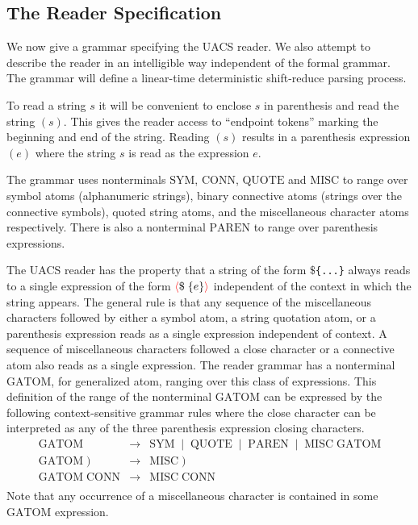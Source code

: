 \documentclass{article}
\newcommand{\fopen}{{\color{red} \langle}}
\newcommand{\fclose}{{\color{red} \rangle}}
\begin{document}
\subsection{The Reader Specification}
\label{sec:reader}

\newcommand{\sym}{\mathrm{SYM}}
\newcommand{\conn}{\mathrm{CONN}}
\newcommand{\quot}{\mathrm{QUOTE}}
\newcommand{\misc}{\mathrm{MISC}}
\newcommand{\gatom}{\mathrm{GATOM}}
\newcommand{\argg}{\mathrm{ARG}}
\newcommand{\e}{\mathrm{E}}
\newcommand{\paren}{\mathrm{PAREN}}
\newcommand{\foo}{\mathtt{foo}}
\newcommand{\barr}{\mathtt{bar}}
  
We now give a grammar specifying the UACS reader.  We also attempt to describe the reader in an intelligible way independent of the formal grammar.
The grammar will define a linear-time deterministic shift-reduce parsing process.

To read a string $s$ it will be convenient to enclose $s$ in parenthesis and read the string $(s)$.  This gives the reader access to ``endpoint tokens'' marking the beginning and end of the string.
Reading $(s)$ results in a parenthesis expression $(e)$ where the string $s$ is read as the expression $e$.

The grammar uses nonterminals
$\sym$, $\conn$, $\quot$ and $\misc$ to range over symbol atoms (alphanumeric strings), binary connective atoms (strings over the connective symbols), quoted string atoms, and
the miscellaneous character atoms respectively.  There is also a nonterminal $\paren$ to range over parenthesis expressions.


The UACS reader has the property that a string of the form {\tt $\$$\{...\}} always reads to a single expression of the form $\fopen \$\;\{e\}\fclose$ independent of the context in which the string appears.
The general rule is that any sequence of the miscellaneous characters followed by either a symbol atom, a string quotation atom, or a parenthesis expression reads as a single expression independent of context.
A sequence of miscellaneous characters followed a close character or a connective atom also reads as a single expression.  The reader grammar has a nonterminal $\gatom$, for generalized atom, ranging over
this class of expressions. This definition of the range of the nonterminal $\gatom$ can be expressed by the following context-sensitive grammar rules
where the close character can be interpreted as any of the three parenthesis expression closing characters.
\begin{eqnarray*}
  \gatom & \rightarrow & \sym \;\;|\;\; \quot \;\;|\;\; \paren \;\;|\;\; \misc\;\gatom \\
  \gatom\;) & \rightarrow & \misc\;) \\
  \gatom\; \conn & \rightarrow & \misc\; \conn \\
\end{eqnarray*}
Note that any occurrence of a miscellaneous character is contained in some $\gatom$ expression.
\end{document}
